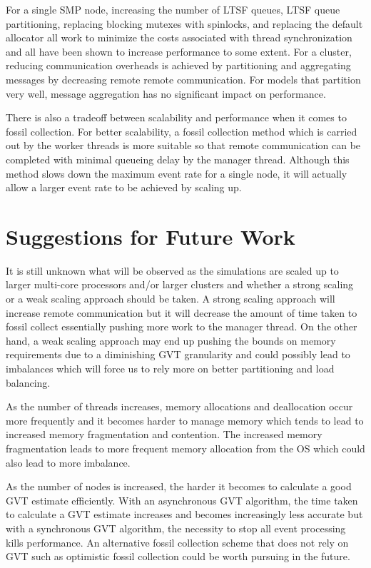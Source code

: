 \documentclass[11pt]{book}
\begin{document}
For a single SMP node, increasing the number of LTSF queues, LTSF queue partitioning,
replacing blocking mutexes with spinlocks, and replacing the default allocator all work to
minimize the costs associated with thread synchronization and all have been shown to increase
performance to some extent.  For a cluster, reducing communication overheads is achieved by
partitioning and aggregating messages by decreasing remote remote communication.  For models that
partition very well, message aggregation has no significant impact on performance.

There is also a tradeoff between scalability and performance when it comes to fossil collection.
For better scalability, a fossil collection method which is carried out by the worker threads is
more suitable so that remote communication can be completed with minimal queueing delay by the
manager thread.  Although this method slows down the maximum event rate for a single node, it will
actually allow a larger event rate to be achieved by scaling up.

\section{Suggestions for Future Work}

It is still unknown what will be observed as the simulations are scaled up to larger
multi-core processors and/or larger clusters and whether a strong scaling or a weak scaling
approach should be taken.  A strong scaling approach will increase remote communication but
it will decrease the amount of time taken to fossil collect essentially pushing more work to
the manager thread.  On the other hand, a weak scaling approach may end up pushing the bounds
on memory requirements due to a diminishing GVT granularity and could possibly lead to imbalances
which will force us to rely more on better partitioning and load balancing.


As the number of threads increases, memory allocations and deallocation occur more frequently
and it becomes harder to manage memory which tends to lead to increased memory fragmentation
and contention.  The increased memory fragmentation leads to more frequent memory allocation
from the OS which could also lead to more imbalance.  

As the number of nodes is increased, the harder it becomes to calculate a good GVT estimate
efficiently.  With an asynchronous GVT algorithm, the time taken to calculate a GVT estimate
increases and becomes increasingly less accurate but with a synchronous GVT algorithm, the
necessity to stop all event processing kills performance.  An alternative fossil collection
scheme that does not rely on GVT such as optimistic fossil collection could be worth pursuing
in the future.
\end{document}
